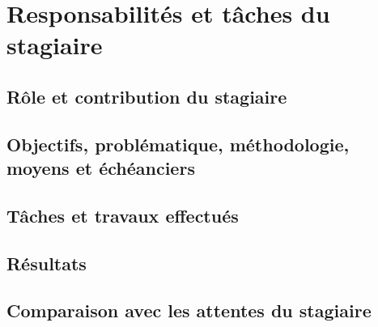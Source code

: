 \section{Responsabilités et tâches du stagiaire}

\subsection{Rôle et contribution du stagiaire}

\subsection{Objectifs, problématique, méthodologie, moyens et échéanciers}

\subsection{Tâches et travaux effectués}

\subsection{Résultats}

\subsection{Comparaison avec les attentes du stagiaire}
